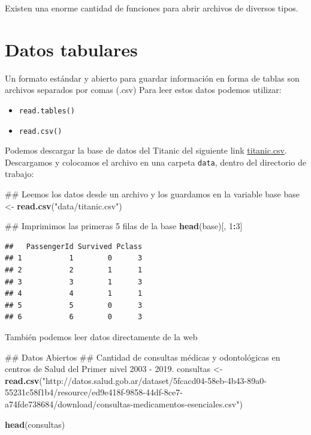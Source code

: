 \documentclass[spanish,]{book}
\newenvironment{Shaded}{\begin{snugshade}}{\end{snugshade}}
\newcommand{\KeywordTok}[1]{\textcolor[rgb]{0.13,0.29,0.53}{\textbf{#1}}}
\newcommand{\DecValTok}[1]{\textcolor[rgb]{0.00,0.00,0.81}{#1}}
\newcommand{\StringTok}[1]{\textcolor[rgb]{0.31,0.60,0.02}{#1}}
\newcommand{\OperatorTok}[1]{\textcolor[rgb]{0.81,0.36,0.00}{\textbf{#1}}}
\newcommand{\NormalTok}[1]{#1}
\providecommand{\tightlist}{%
  \setlength{\itemsep}{0pt}\setlength{\parskip}{0pt}}
\begin{document}
Existen una enorme cantidad de funciones para abrir archivos de diversos
tipos.

\section{Datos tabulares}\label{datos-tabulares}

Un formato estándar y abierto para guardar información en forma de
tablas son archivos separados por comas (.csv) Para leer estos datos
podemos utilizar:

\begin{itemize}
\tightlist
\item
  \texttt{read.tables()}
\item
  \texttt{read.csv()}
\end{itemize}

Podemos descargar la base de datos del Titanic del siguiente link
\href{../data/titanic.csv}{titanic.csv}. Descargamos y colocamos el
archivo en una carpeta \texttt{data}, dentro del directorio de trabajo:

\begin{Shaded}
\begin{Highlighting}[]
\NormalTok{## Leemos los datos desde un archivo y los guardamos en la variable base}
\NormalTok{base <-}\StringTok{ }\KeywordTok{read.csv}\NormalTok{(}\StringTok{"data/titanic.csv"}\NormalTok{)}

\NormalTok{## Imprimimos las primeras 5 filas de la base}
\KeywordTok{head}\NormalTok{(base)[, }\DecValTok{1}\OperatorTok{:}\DecValTok{3}\NormalTok{]}
\end{Highlighting}
\end{Shaded}

\begin{verbatim}
##   PassengerId Survived Pclass
## 1           1        0      3
## 2           2        1      1
## 3           3        1      3
## 4           4        1      1
## 5           5        0      3
## 6           6        0      3
\end{verbatim}

También podemos leer datos directamente de la web

\begin{Shaded}
\begin{Highlighting}[]
\NormalTok{## Datos Abiertos}
\NormalTok{## Cantidad de consultas médicas y odontológicas en centros de Salud del Primer nivel 2003 - 2019.}
\NormalTok{consultas <-}\StringTok{ }\KeywordTok{read.csv}\NormalTok{(}\StringTok{"http://datos.salud.gob.ar/dataset/5fcacd04-58eb-4b43-89a0-55231c58f1b4/resource/ed9e418f-9858-44df-8ce7-a74fde738684/download/consultas-medicamentos-esenciales.csv"}\NormalTok{)}


\KeywordTok{head}\NormalTok{(consultas)}
\end{Highlighting}
\end{Shaded}
\end{document}
